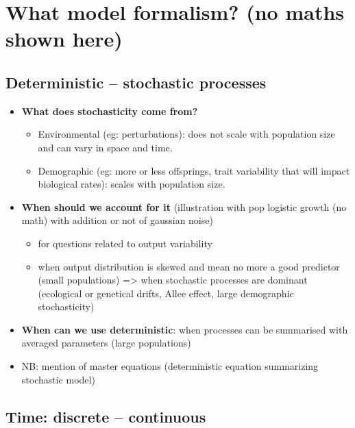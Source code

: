 \documentclass[
]{book}
\providecommand{\tightlist}{%
  \setlength{\itemsep}{0pt}\setlength{\parskip}{0pt}}
\theoremstyle{definition}
\theoremstyle{definition}
\theoremstyle{definition}
\theoremstyle{definition}
\theoremstyle{remark}
\begin{document}
\section{What model formalism? (no maths shown here)}\label{what-model-formalism-no-maths-shown-here}

\subsection{Deterministic -- stochastic processes}\label{deterministic-stochastic-processes}

\begin{itemize}
\tightlist
\item
  \textbf{What does stochasticity come from?}

  \begin{itemize}
  \tightlist
  \item
    Environmental (eg: perturbations): does not scale with population size and can vary in space and time.
  \item
    Demographic (eg: more or less offsprings, trait variability that will impact biological rates): scales with population size.
  \end{itemize}
\item
  \textbf{When should we account for it} (illustration with pop logistic growth (no math) with addition or not of gaussian noise)

  \begin{itemize}
  \tightlist
  \item
    for questions related to output variability
  \item
    when output distribution is skewed and mean no more a good predictor (small populations) =\textgreater{} when stochastic processes are dominant (ecological or genetical drifts, Allee effect, large demographic stochasticity)
  \end{itemize}
\item
  \textbf{When can we use deterministic}: when processes can be summarised with averaged parameters (large populations)
\item
  NB: mention of master equations (deterministic equation summarizing stochastic model)
\end{itemize}

\subsection{Time: discrete -- continuous}\label{time-discrete-continuous}
\end{document}
